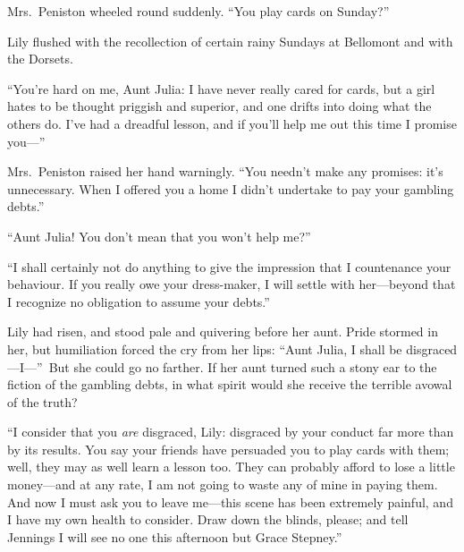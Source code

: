 \documentclass[12pt,a4paper]{book}
\begin{document}
Mrs.\ Peniston wheeled round suddenly. ``You play cards on Sunday?''





Lily flushed with the recollection of certain rainy Sundays at
Bellomont and with the Dorsets.





``You're hard on me, Aunt Julia: I have never really cared for
cards, but a girl hates to be thought priggish and superior, and
one drifts into doing what the others do. I've had a dreadful
lesson, and if you'll help me out this time I promise you---''





Mrs.\ Peniston raised her hand warningly. ``You needn't make any
promises: it's unnecessary. When I offered you a home I didn't
undertake to pay your gambling debts.''





``Aunt Julia! You don't mean that you won't help me?''





``I shall certainly not do anything to give the impression that I
countenance your behaviour. If you really owe your dress-maker, I
will settle with her---beyond that I recognize no obligation to
assume your debts.''





Lily had risen, and stood pale and quivering before her aunt. 
Pride stormed in her, but humiliation forced the cry from her
lips: ``Aunt Julia, I shall be disgraced---I---''\ But she could go no
farther. If her aunt turned such a stony ear to the fiction of
the gambling debts, in what spirit would she receive the terrible
avowal of the truth?





``I consider that you \textit{are} disgraced, Lily: disgraced by your
conduct far more than by its results. You say your friends have
persuaded you to play cards with them; well, they may as well
learn a lesson too. They can probably afford to lose a little
money---and at any rate, I am not going to waste any of mine in
paying them. And now I must ask you to leave me---this scene has
been extremely painful, and I have my own health to consider. 
Draw down the blinds, please; and tell Jennings I will see no one
this afternoon but Grace Stepney.''
\end{document}
